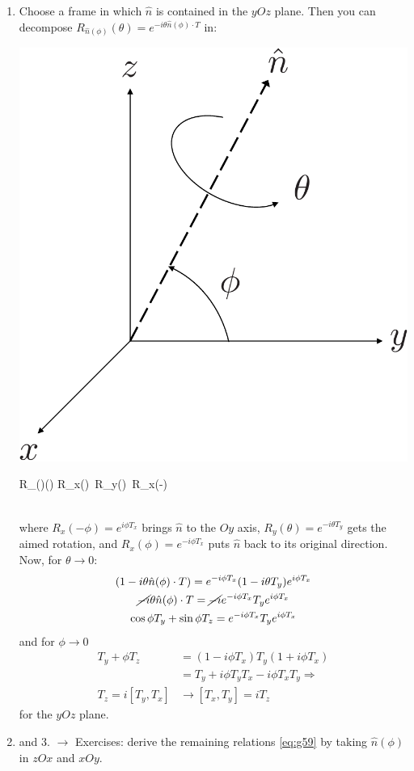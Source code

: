 \documentclass[12pt]{article}
\begin{document}
\begin{enumerate}
\item Choose a frame in which $\hat{n}$ is contained in the $y O z$ plane.
Then you can decompose $R_{\hat{n}(\phi)}(\theta) = e^{-i\theta \hat{n}(\phi)\cdot T}$ in:\\[0.6em]
\begin{minipage}{0.35\textwidth}
\includegraphics[width=\textwidth]{Figures/simpleRotation-crop.pdf}
\end{minipage}%
\begin{minipage}{0.65\textwidth}
\be
R_{(\phi)}(\theta) \equiv R_x(\phi)\, R_y(\theta)\, R_x(-\phi)	
\ee
\end{minipage}\\[0.6em]%
where 
$R_x(-\phi)  = e^{ i\phi T_x}$ brings $\hat{n}$ to the $Oy$ axis,
$R_y(\theta) = e^{-i\theta T_y}$ gets the aimed rotation, and
$R_x( \phi)  = e^{-i\phi T_x}$ puts $\hat{n}$ back to its original direction. 
Now, for $\theta \to 0$:
\[
\begin{gathered}
(1 - i\theta \hat{n}(\phi)\cdot T) = e^{-i\phi T_x} (1 - i\theta T_y) e^{ i\phi T_x}\\
\cancel{-i} \theta \hat{n}(\phi)\cdot T = \cancel{-i} e^{-i\phi T_x} T_y e^{ i\phi T_x}\\
\cos \phi T_y + \sin \phi T_z = e^{-i\phi T_x} T_y e^{ i\phi T_x}
\end{gathered}
\]
and for $\phi \to 0$
\[
\begin{aligned}
T_y + \phi T_z 
&= (1 - i\phi T_x) T_y (1 + i\phi T_x)\\
&= T_y + i\phi T_y T_x - i\phi T_x T_y\Rightarrow\\
T_z = i[T_y,T_x] &\rightarrow [T_x,T_y] = iT_z
\end{aligned}
\]
for the $yOz$ plane.
\item and 3. $\rightarrow$ Exercises: derive the remaining relations \eqref{eq:g59}
by taking $\hat{n}(\phi)$ in $zOx$ and $xOy$.
\end{enumerate}
\end{document}
